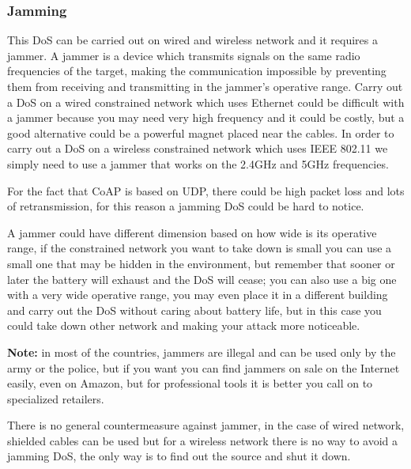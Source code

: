 	\subsubsection{Jamming}
	This DoS can be carried out on wired and wireless network and it requires a jammer.\newline
	A jammer is a device which transmits signals on the same radio frequencies of the target, making the communication impossible by preventing them from receiving and transmitting in the jammer’s operative range.\newline
	Carry out a DoS on a wired constrained network which uses Ethernet could be difficult with a jammer because you may need very high frequency and it could be costly, but a good alternative could be a powerful magnet placed near the cables.\newline
	In order to carry out a DoS on a wireless constrained network which uses IEEE 802.11 we simply need to use a jammer that works on the 2.4GHz and 5GHz frequencies.\newline
	
	For the fact that CoAP is based on UDP, there could be high packet loss and lots of retransmission, for this reason a jamming DoS could be hard to notice.\newline
	
	A jammer could have different dimension based on how wide is its operative range, if the constrained network you want to take down is small you can use a small one that may be hidden in the environment, but remember that sooner or later the battery will exhaust and the DoS will cease; you can also use a big one with a very wide operative range, you may even place it in a different building and carry out the DoS without caring about battery life, but in this case you could take down other network and making your attack more noticeable.\newline
	
	\textbf{Note:} in most of the countries, jammers are illegal and can be used only by the army or the police, but if you want you can find jammers on sale on the Internet easily, even on Amazon, but for professional tools it is better you call on to specialized retailers.\newline
	
	There is no general countermeasure against jammer, in the case of wired network, shielded cables can be used but for a wireless network there is no way to avoid a jamming DoS, the only way is to find out the source and shut it down.\newline
	
